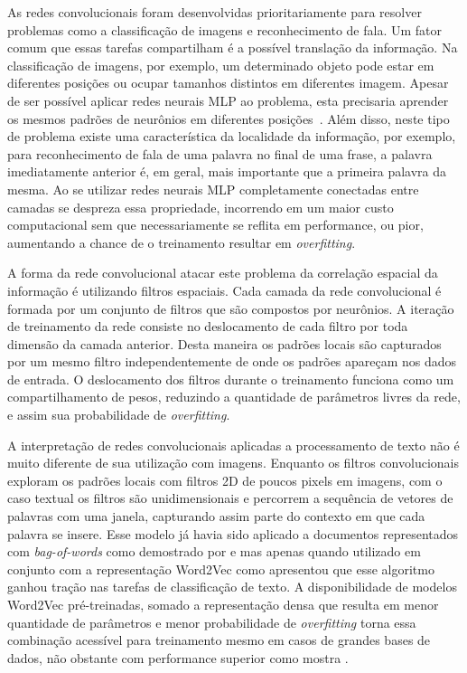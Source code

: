 As redes convolucionais foram desenvolvidas prioritariamente para resolver
problemas como a classificação de imagens e reconhecimento de fala.
Um fator comum que essas tarefas compartilham é a possível translação da
informação.
Na classificação de imagens, por exemplo, um determinado objeto pode estar em
diferentes posições ou ocupar tamanhos distintos em diferentes imagem.
Apesar de ser possível aplicar redes neurais MLP ao problema, esta precisaria
aprender os mesmos padrões de neurônios em diferentes posições~\cite{lecun95}.
Além disso, neste tipo de problema existe uma característica da localidade da
informação, por exemplo, para reconhecimento de fala de uma palavra no final de
uma frase, a palavra imediatamente anterior é, em geral, mais importante que a
primeira palavra da mesma.
Ao se utilizar redes neurais MLP completamente conectadas entre camadas se
despreza essa propriedade, incorrendo em um maior custo computacional sem que
necessariamente se reflita em performance, ou pior, aumentando a chance de o
treinamento resultar em \textit{overfitting}.

A forma da rede convolucional atacar este problema da correlação espacial da
informação é utilizando filtros espaciais.
Cada camada da rede convolucional é formada por um conjunto de filtros que são
compostos por neurônios.
A iteração de treinamento da rede consiste no deslocamento de cada filtro por
toda dimensão da camada anterior.
Desta maneira os padrões locais são capturados por um mesmo filtro
independentemente de onde os padrões apareçam nos dados de entrada.
O deslocamento dos filtros durante o treinamento funciona como um
compartilhamento de pesos, reduzindo a quantidade de parâmetros livres da rede,
e assim sua probabilidade de \textit{overfitting}.

A interpretação de redes convolucionais aplicadas a processamento de texto não é
muito diferente de sua utilização com imagens.
Enquanto os filtros convolucionais exploram os padrões locais com filtros 2D de
poucos pixels em imagens, com o caso textual os filtros são unidimensionais e
percorrem a sequência de vetores de palavras com uma janela, capturando assim
parte do contexto em que cada palavra se insere.
Esse modelo já havia sido aplicado a documentos representados com
\textit{bag-of-words} como demostrado por \citet{kalchbrenner14} e
\citet{yih14} mas apenas quando utilizado em conjunto com a representação
Word2Vec como apresentou \citet{kim14} que esse algoritmo ganhou tração nas
tarefas de classificação de texto.
A disponibilidade de modelos Word2Vec pré-treinadas, somado a representação
densa que resulta em menor quantidade de parâmetros e menor probabilidade de
\textit{overfitting} torna essa combinação acessível para treinamento mesmo em
casos de grandes bases de dados, não obstante com performance superior como
mostra \citet{kim14}.


